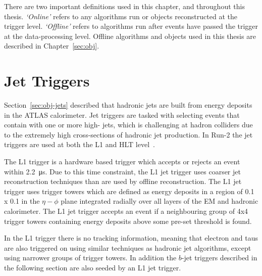 There are two important definitions used in this chapter, and throughout this thesis.
\textit{`Online'} refers to any algorithms run or objects reconstructed at the trigger level.
\textit{`Offline'} refers to algorithms run after events have passed the trigger at the data-processing level.
Offline algorithms and objects used in this thesis are described in Chapter~\ref{sec:obj}.

\section{Jet Triggers}
\label{sec:trig-jet}

Section~\ref{sec:obj-jets} described that hadronic jets are built from energy deposits in the ATLAS calorimeter.
Jet triggers are tasked with selecting events that contain with one or more high-\pT{} jets,
which is challenging at hadron colliders due to the extremely high cross-sections of hadronic jet production.
In Run-2 the jet triggers are used at both the L1 and HLT level~\cite{trig-run2_proc}.


The L1 trigger is a hardware based trigger which accepts or rejects an event within \SI{2.2}{\micro\second}.
Due to this time constraint, the L1 jet trigger uses coarser jet reconstruction techniques than are used by offline reconstruction.
The L1 jet trigger uses trigger towers which are defined as energy deposits in a region of 0.1 x 0.1 in the $\eta-\phi$ plane integrated radially over all layers of the EM and hadronic calorimeter.
The L1 jet trigger accepts an event if a neighbouring group of 4x4 trigger towers containing energy deposits above some pre-set threshold is found.

In the  L1 trigger there is no tracking information, meaning that electron and taus
are also triggered on using similar techniques as hadronic jet algorithms, except using narrower groups of trigger towers.
In addition the $b$-jet triggers described in the following section are also seeded by an L1 jet trigger.

